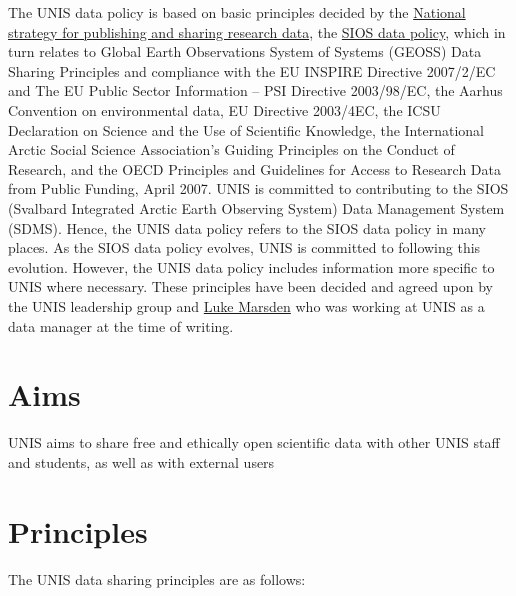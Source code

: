 \documentclass[a4paper,english, 11pt]{article}
\begin{document}
The UNIS data policy is based on basic principles decided by the \href{https://www.regjeringen.no/no/dokumenter/nasjonal-strategi-for-tilgjengeliggjoring-og-deling-av-forskningsdata/id2582412/}{National strategy for publishing and sharing research data}, the \href{https://sios-svalbard.org/sites/sios-svalbard.org/files/common/SIOS_Data_Policy.pdf}{SIOS data policy}, which in turn relates to Global Earth Observations System of Systems (GEOSS) Data Sharing Principles and compliance with the EU INSPIRE Directive 2007/2/EC and The EU Public Sector Information – PSI Directive 2003/98/EC, the Aarhus Convention on environmental
data, EU Directive 2003/4EC, the ICSU Declaration on Science and the Use of Scientific Knowledge, the International Arctic Social Science Association’s Guiding Principles on the
Conduct of Research, and the OECD Principles and Guidelines for Access to Research Data from Public Funding, April 2007. UNIS is committed to contributing to the SIOS (Svalbard Integrated Arctic Earth Observing System) Data Management System (SDMS). Hence, the UNIS data policy refers to the SIOS data policy in many places. As the SIOS data policy evolves, UNIS is committed to following this evolution. However, the UNIS data policy includes information more specific to UNIS where necessary. These principles have been decided and agreed upon by the UNIS leadership group and \href{https://orcid.org/0000-0002-9746-544X}{Luke Marsden} who was working at UNIS as a data manager at the time of writing.  

\section{Aims}
\label{s:aims}

UNIS aims to share free and ethically open scientific data with other UNIS staff and students, as well as with external users 

\section{Principles}
\label{s:principles}

The UNIS data sharing principles are as follows:
\end{document}
